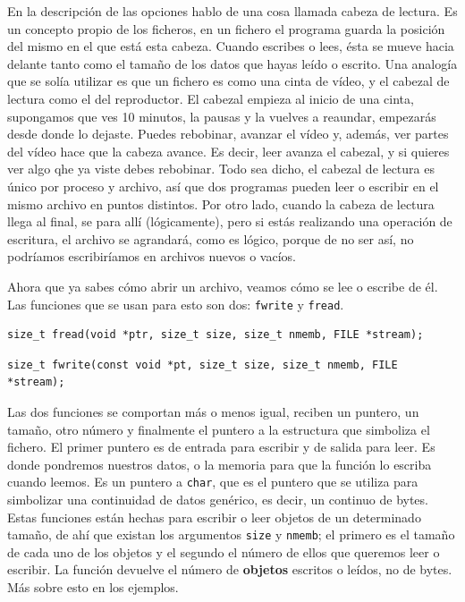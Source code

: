 \documentclass[a4paper]{article}
\begin{document}
En la descripción de las opciones hablo de una cosa llamada cabeza de lectura.
Es un concepto propio de los ficheros, en un fichero el programa guarda la
posición del mismo en el que está esta cabeza. Cuando escribes o lees, ésta
se mueve hacia delante tanto como el tamaño de los datos que hayas leído o
escrito.
Una analogía que se solía utilizar es que un fichero es como una cinta de vídeo,
y el cabezal de lectura como el del reproductor. El cabezal empieza al inicio
de una cinta, supongamos que ves 10 minutos, la pausas y la vuelves a reaundar,
empezarás
desde donde lo dejaste. Puedes rebobinar, avanzar el vídeo y, además, ver partes
del vídeo hace que la cabeza avance. Es decir, leer avanza el cabezal, y si
quieres ver algo qhe ya viste debes rebobinar.
Todo sea dicho, el cabezal de lectura es único por
proceso y archivo, así que dos programas pueden leer o escribir en el mismo
archivo en puntos distintos. Por otro lado, cuando la cabeza de lectura llega
al final, se para allí (lógicamente), pero si estás realizando una operación
de escritura, el archivo se agrandará, como es lógico, porque de no ser así,
no podríamos escribiríamos en archivos nuevos o vacíos.

Ahora que ya sabes cómo abrir un archivo, veamos cómo se lee o escribe de él.
Las funciones que se usan para esto son dos: \verb!fwrite! y \verb!fread!.

\noindent
\begin{minipage}[H]{\linewidth}
\mbox{}
\begin{lstlisting}[style=C,
caption={Declaración de la función \texttt{fread}},
label={lst:freadSignature}]
size_t fread(void *ptr, size_t size, size_t nmemb, FILE *stream);
\end{lstlisting}
\end{minipage}

\noindent
\begin{minipage}[H]{\linewidth}
\mbox{}
\begin{lstlisting}[style=C,
caption={Declaración de la función \texttt{fwrite}},
label={lst:fwriteSignature}]
size_t fwrite(const void *pt, size_t size, size_t nmemb, FILE *stream);
\end{lstlisting}
\end{minipage}

Las dos funciones se comportan más o menos igual, reciben un puntero, un tamaño,
otro número y finalmente el puntero a la estructura que simboliza el fichero.
El primer puntero es de entrada para escribir y de salida para leer. Es donde
pondremos nuestros datos, o la memoria para que la función lo escriba cuando
leemos. Es un puntero a \verb!char!, que es el puntero que se utiliza para
simbolizar una continuidad de datos genérico, es decir, un continuo de bytes.
Estas funciones están hechas para escribir o leer objetos de un determinado
tamaño, de ahí que existan los argumentos \verb!size! y \verb!nmemb!; el primero
es el tamaño de cada uno de los objetos y el segundo el número de ellos que
queremos leer o escribir. La función devuelve el número de \textbf{objetos}
escritos o leídos, no de bytes. Más sobre esto en los ejemplos.
\end{document}
